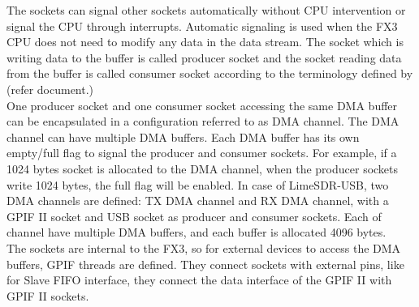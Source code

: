 The sockets can signal other sockets automatically without CPU intervention or signal the CPU through interrupts.
Automatic signaling is used when the FX3 CPU does not need to modify any data in the data stream.
The socket which is writing data to the buffer is called producer socket and the socket reading data from the buffer is called consumer socket according to the terminology defined by (refer document.)\\

One producer socket and one consumer socket accessing the same \ac{DMA} buffer can be encapsulated in a configuration referred to as \ac{DMA} channel.
The \ac{DMA} channel can have multiple \ac{DMA} buffers.
Each DMA buffer has its own empty/full flag to signal the producer and consumer sockets.
For example, if a 1024 bytes socket is allocated to the DMA channel, when the producer sockets write 1024 bytes, the full flag will be enabled.
In case of LimeSDR-USB, two \ac{DMA} channels are defined: TX \ac{DMA} channel and RX \ac{DMA} channel, with a GPIF II socket and USB socket as producer and consumer sockets.
Each of channel have multiple \ac{DMA} buffers, and each buffer is allocated 4096 bytes.\\

The sockets are internal to the FX3, so for external devices to access the \ac{DMA} buffers, GPIF threads are defined.
They connect sockets with external pins, like for Slave FIFO interface, they connect the data interface of the GPIF II with GPIF II sockets.\\


